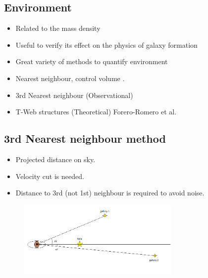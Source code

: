 \documentclass[xcolor=dvipsnames]{beamer}
\begin{document}
\subsection{Environment}
\begin{frame}
\begin{itemize}
\item Related to the mass density 
\item Useful to verify its effect on the physics of galaxy formation
\item Great variety of methods to quantify environment
\item Nearest neighbour, control volume \cite{environments}.  
\item 3rd Nearest neighbour (Observational) \cite{jones}
\item T-Web structures (Theoretical) Forero-Romero et al. \cite{forero}
\end{itemize}
\end{frame}
\subsection{3rd Nearest neighbour method}
\begin{frame}
\begin{itemize}
\item Projected distance on sky.
\item Velocity cut is needed.
\item Distance to 3rd (not 1st) neighbour is required to avoid noise.
\end{itemize}
\begin{figure}[h!]
\centering
\includegraphics[width=0.7\textwidth]{nearest_neighbor}
\centering
\end{figure}
\end{frame}
\end{document}
